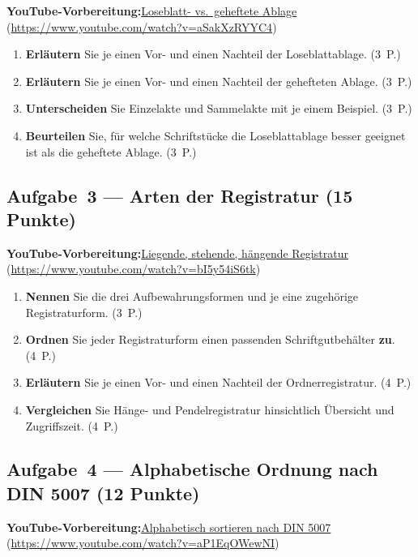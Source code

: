 \documentclass[11pt, a4paper]{article}
\begin{document}
\noindent\textbf{\color{bfwAccent}YouTube-Vorbereitung:}\enspace \href{https://www.youtube.com/watch?v=aSakXzRYYC4}{Loseblatt- vs.\ geheftete Ablage} (\url{https://www.youtube.com/watch?v=aSakXzRYYC4})

\medskip
\begin{enumerate}[label=(\alph*)]
  \item \textbf{Erläutern} Sie je einen Vor- und einen Nachteil der Loseblattablage. \hfill (3~P.)
  \item \textbf{Erläutern} Sie je einen Vor- und einen Nachteil der gehefteten Ablage. \hfill (3~P.)
  \item \textbf{Unterscheiden} Sie Einzelakte und Sammelakte mit je einem Beispiel. \hfill (3~P.)
  \item \textbf{Beurteilen} Sie, für welche Schriftstücke die Loseblattablage besser geeignet ist als die geheftete Ablage. \hfill (3~P.)
\end{enumerate}

\subsection*{Aufgabe~3 --- Arten der Registratur (15 Punkte)}

\noindent\textbf{\color{bfwAccent}YouTube-Vorbereitung:}\enspace \href{https://www.youtube.com/watch?v=bI5y54iS6tk}{Liegende, stehende, hängende Registratur} (\url{https://www.youtube.com/watch?v=bI5y54iS6tk})

\medskip
\begin{enumerate}[label=(\alph*)]
  \item \textbf{Nennen} Sie die drei Aufbewahrungsformen und je eine zugehörige Registraturform. \hfill (3~P.)
  \item \textbf{Ordnen} Sie jeder Registraturform einen passenden Schriftgutbehälter \textbf{zu}. \hfill (4~P.)
  \item \textbf{Erläutern} Sie je einen Vor- und einen Nachteil der Ordnerregistratur. \hfill (4~P.)
  \item \textbf{Vergleichen} Sie Hänge- und Pendelregistratur hinsichtlich Übersicht und Zugriffszeit. \hfill (4~P.)
\end{enumerate}

\subsection*{Aufgabe~4 --- Alphabetische Ordnung nach DIN 5007 (12 Punkte)}

\noindent\textbf{\color{bfwAccent}YouTube-Vorbereitung:}\enspace \href{https://www.youtube.com/watch?v=aP1EqOWewNI}{Alphabetisch sortieren nach DIN 5007} (\url{https://www.youtube.com/watch?v=aP1EqOWewNI})
\end{document}
